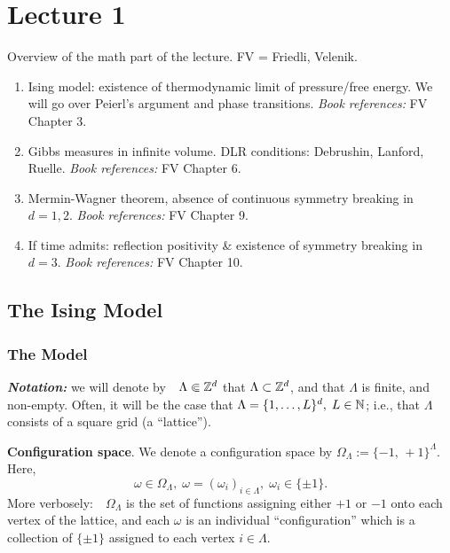 \documentclass{article}
\begin{document}
\tableofcontents

\section{Lecture 1}
\label{sec:lecture1}

Overview of the math part of the lecture. FV = Friedli, Velenik.

\begin{enumerate}
\item Ising model: existence of thermodynamic limit of pressure/free energy. We will go over Peierl's argument and phase transitions. \textit{Book references:} FV Chapter 3.
\item Gibbs measures in infinite volume. DLR conditions: Debrushin, Lanford, Ruelle. \textit{Book references:} FV Chapter 6.
\item Mermin-Wagner theorem, absence of continuous symmetry breaking in $d = 1, 2$. \textit{Book references:} FV Chapter 9.
\item If time admits: reflection positivity \& existence of symmetry breaking in $d = 3$. \textit{Book references:} FV Chapter 10.
\end{enumerate}

\subsection{The Ising Model}
\label{sec:ising_model}

\subsubsection{The Model}

\textbf{\textit{Notation:}} we will denote by~\index{$\Lambda$}~$\Lambda \Subset \mathbb{Z}^d$ that $\Lambda \subset \mathbb{Z}^d$, and that $\Lambda$ is finite, and non-empty. Often, it will be the case that $\Lambda = \{ 1 , \dots , L \}^d, \; L \in \mathbb{N}$; i.e., that $\Lambda$ consists of a square grid (a ``lattice'').

\textbf{Configuration space}. We denote a configuration space by $\Omega_{\Lambda} := \{ -1, \, +1 \}^{\Lambda}$. Here,
\begin{equation}
  \omega \in \Omega_{\Lambda}, \; \omega = (\omega_i)_{i \in\Lambda}, \; \omega_i\in \{ \pm 1\}.
\end{equation}
More verbosely:~\index{$\Omega_{\Lambda}$}~$\Omega_{\Lambda}$ is the set of functions assigning either $+1$ or $-1$ onto each vertex of the lattice, and each $\omega$ is an individual ``configuration'' which is a collection of $\{ \pm 1 \}$ assigned to each vertex $i \in \Lambda$.
\end{document}
